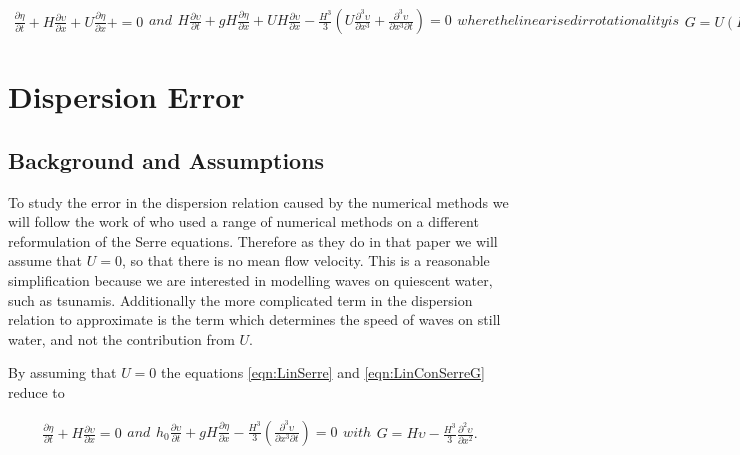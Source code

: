\begin{subequations}
	\begin{gather}
		\label{eqn:LinCont}
		\frac{\partial  \eta}{\partial  t} + H\frac{\partial  \upsilon}{\partial  x} + U\frac{\partial  \eta}{\partial  x} +  = 0
	\end{gather}
	and
	\begin{gather}
	\label{eqn:LineMome}
	H\frac{\partial  \upsilon}{\partial  t} + gH\frac{\partial  \eta}{\partial  x} + UH\frac{\partial  \upsilon}{\partial  x} - \frac{H^3}{3}\left(U\frac{\partial^3  \upsilon}{\partial  x^3} + \frac{\partial^3  \upsilon}{\partial  x^3 \partial  t}  \right)  = 0
	\end{gather}
\label{eqn:LinSerre}	
where the linearised irrotationality is
\begin{gather}
	G = U\left(H + \eta\right) + H\upsilon -\frac{H^3}{3} \frac{\partial^2 \upsilon}{\partial x^2}.
	\label{eqn:LinConSerreG}
\end{gather}	
\end{subequations}

\section{Dispersion Error}

\subsection{Background and Assumptions}
To study the error in the dispersion relation caused by the numerical methods we will follow the work of \cite{Filippini-etal-2016-381} who used a range of numerical methods on a different reformulation of the Serre equations. Therefore as they do in that paper we will assume that $U = 0$, so that there is no mean flow velocity. This is a reasonable simplification because we are interested in modelling waves on quiescent water, such as tsunamis. Additionally the more complicated term in the dispersion relation to approximate is the term which determines the speed of waves on still water, and not the contribution from $U$.

By assuming that $U= 0$ the equations \eqref{eqn:LinSerre} and \eqref{eqn:LinConSerreG} reduce to

\begin{subequations}
	\label{eqn:LinSerreu0}
	\begin{gather}
	\label{eqn:LinContu0}
	\frac{\partial  \eta}{\partial  t} + H\frac{\partial  \upsilon}{\partial  x} = 0
	\end{gather}
	and
	\begin{gather}
	\label{eqn:LineMomeu0}
	h_0\frac{\partial  \upsilon}{\partial  t} + g H \frac{\partial  \eta}{\partial  x} - \frac{H^3}{3}\left(\frac{\partial^3  \upsilon}{\partial  x^3 \partial  t}  \right)  = 0
	\end{gather}	
with
	\begin{gather}
	G = H\upsilon -\frac{H^3}{3} \frac{\partial^2 \upsilon}{\partial x^2}.
	\label{eqn:LinConSerreGu0}
	\end{gather}	
\end{subequations}

